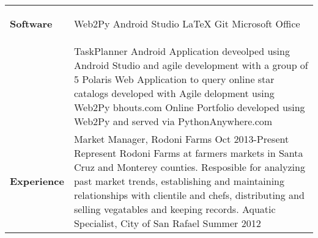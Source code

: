 \documentclass[11pt]{article}
\begin{document}
\begin{tabular}{p{3.3cm}  p{13cm}}
\\
\textbf{Software}  & \vspace{-7.7mm}
	\begin{multicols}{2}
				Web2Py \newline
				Android Studio \newline
				\LaTeX \newline
				Git \newline
				Microsoft Office 
	\end{multicols}
\\
\color{blue}{\textbf{Projects}}  & \vspace{0mm}
		TaskPlanner \hspace{3.51mm} \normalsize 
			Android Application deveolped using Android Studio \hspace*{4.08cm} and agile development 				with a group of 5 \newline\Large
		Polaris \hspace{1.7cm} \normalsize
			Web Application to query online star catalogs developed \hspace*{4.08cm}with Agile 								delopment using Web2Py \newline\Large
		bhouts.com \hspace{7mm} \normalsize 
			Online Portfolio developed using Web2Py and served via \hspace*{4.08cm}												PythonAnywhere.com\newline\Large
			
\\
\vspace{-1cm}

\textbf{Experience}  &  \vspace{-1cm}
Market Manager, Rodoni Farms \hspace{3cm}\normalsize Oct 2013-Present\newline\normalsize 
Represent Rodoni Farms at farmers markets in Santa Cruz and Monterey counties. Resposible for analyzing past market trends, establishing and maintaining relationships with clientile and chefs, distributing and selling vegatables and keeping records.
 \Large \vspace{2mm}
\newline 
Aquatic Specialist, City of San Rafael \hspace{2.2cm} \normalsize Summer 2012\newline\normalsize




\end{tabular}
\end{document}

